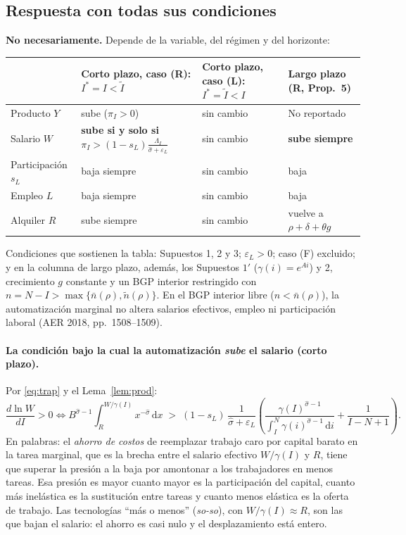 \documentclass[11pt,a4paper]{article}
\theoremstyle{definition}
\theoremstyle{plain}
\theoremstyle{remark}
\numberwithin{equation}{section}
\newcommand{\sh}{\hat\sigma}
\newcommand{\It}{\tilde I}
\newcommand{\Is}{I^{*}}
\newcommand{\dd}{\,\mathrm{d}}
\newcommand{\eps}{\varepsilon}
\begin{document}
\subsection{Respuesta con todas sus condiciones}
\textbf{No necesariamente.} Depende de la variable, del régimen y del horizonte:
\begin{center}
\small
\begin{tabular}{@{}p{3.6cm}p{3.2cm}p{3.4cm}p{3.6cm}@{}}
\toprule
 & Corto plazo, caso (R): $\Is=I<\It$ & Corto plazo, caso (L): $\Is=\It<I$ & Largo plazo (R, Prop.~5)\\
\midrule
Producto $Y$ & sube ($\pi_I>0$) & sin cambio & No reportado\\
Salario $W$ & \textbf{sube si y solo si} $\pi_I>(1-s_L)\frac{\Lambda_I}{\sh+\eps_L}$ & sin cambio & \textbf{sube siempre}\\
Participación $s_L$ & baja siempre & sin cambio & baja\\
Empleo $L$ & baja siempre & sin cambio & baja\\
Alquiler $R$ & sube siempre & sin cambio & vuelve a $\rho+\delta+\theta g$\\
\bottomrule
\end{tabular}
\end{center}
Condiciones que sostienen la tabla: Supuestos 1, 2 y 3; $\eps_L>0$; caso (F) excluido; y en la columna de largo
plazo, además, los Supuestos $1'$ ($\gamma(i)=e^{Ai}$) y 2, crecimiento $g$ constante y un BGP interior restringido con $n=N-I>\max\{\bar n(\rho),\tilde n(\rho)\}$. En el BGP interior libre ($n<\bar n(\rho)$), la automatización marginal no altera salarios efectivos, empleo ni participación laboral (AER 2018, pp.~1508--1509).

\paragraph{La condición bajo la cual la automatización \emph{sube} el salario (corto plazo).} Por
\eqref{eq:trap} y el Lema~\ref{lem:prod}:
\[
  \frac{d\ln W}{dI}>0\iff B^{\sh-1}\int_{R}^{W/\gamma(I)}x^{-\sh}\dd x\;>\;(1-s_L)\,\frac{1}{\sh+\eps_L}\left(\frac{\gamma(I)^{\sh-1}}{\int_I^N\gamma(i)^{\sh-1}\dd i}+\frac{1}{I-N+1}\right).
\]
En palabras: el \emph{ahorro de costos} de reemplazar trabajo caro por capital barato en la tarea marginal, que
es la brecha entre el salario efectivo $W/\gamma(I)$ y $R$, tiene que superar la presión a la baja por amontonar a los
trabajadores en menos tareas. Esa presión es mayor cuanto mayor es la participación del capital, cuanto más
inelástica es la sustitución entre tareas y cuanto menos elástica es la oferta de trabajo. Las tecnologías
``más o menos'' (\emph{so-so}), con $W/\gamma(I)\approx R$, son las que bajan el salario: el ahorro es casi nulo y el
desplazamiento está entero.
\end{document}
